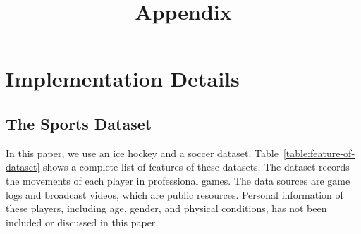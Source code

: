 \documentclass{article}
\title{Appendix}
\author{
}
\begin{document}
\maketitle

\appendix

\section{Implementation Details}
\renewcommand{\thetable}{A.\arabic{table}}
\setcounter{table}{0}
\subsection{The Sports Dataset}

In this paper, we use an ice hockey and a soccer dataset. Table~\ref{table:feature-of-dataset} shows a complete list of features of these datasets. The dataset records the movements of each player in professional games. The data sources are game logs and broadcast videos, which are public resources. Personal information of these players, including age, gender, and physical conditions, has not been included or discussed in this paper.
\end{document}
